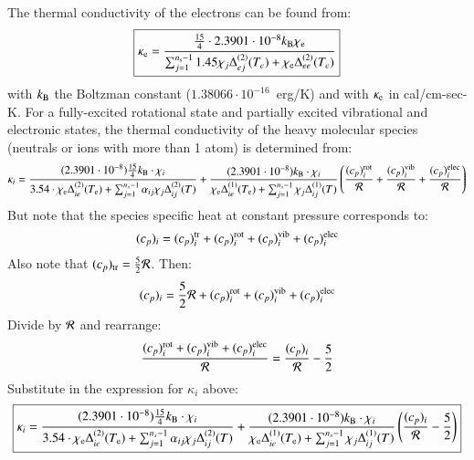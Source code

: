 \documentclass{warpdoc}
\newcommand\frameeqn[1]{\fbox{$\displaystyle #1$}}
\begin{document}
The thermal conductivity of the electrons can be found from:
%
\begin{equation}
\frameeqn{
\kappa_{\rm e}=\frac{\frac{15}{4} \cdot 2.3901 \cdot 10^{-8} k_{\rm B} \chi_{\rm e}}{\sum_{j=1}^{n_{\rm s}-1}1.45 \chi_j \Delta_{ej}^{(2)}(T_e) +\chi_{\rm e} \Delta_{ee}^{(2)}(T_e)  }
}
\end{equation}
%
with $k_{\rm B}$ the Boltzman constant ($1.38066\cdot10^{-16}$~erg/K) and with $\kappa_{\rm e}$ in cal/cm-sec-K.
For a fully-excited  rotational state and partially excited vibrational and electronic states, the thermal conductivity of the heavy molecular species (neutrals or ions with more than 1 atom) is determined from:
%
\begin{equation}
\kappa_i = 
\frac{(2.3901\cdot10^{-8}) \frac{15}{4} k_{\rm B}  \cdot \chi_i}{3.54\cdot \chi_{\rm e} \Delta_{ie}^{(2)}(T_{\rm e})+ \sum_{j=1}^{n_s-1} \alpha_{ij} \chi_j \Delta_{ij}^{(2)}(T) }
+
\frac{(2.3901\cdot10^{-8}) k_{\rm B}  \cdot \chi_i}{ \chi_{\rm e} \Delta_{ie}^{(1)}(T_{\rm e})+\sum_{j=1}^{n_s-1} \chi_j \Delta_{ij}^{(1)}(T) }
\left(
\frac{(c_p)_{i}^{{\rm rot}}}{\cal R}+ \frac{(c_p)_{i}^{{\rm vib}}}{\cal R}
+ \frac{(c_p)_{i}^{{\rm elec}}}{\cal R}
\right)
\end{equation}
%
But note that the species specific heat at constant pressure corresponds to:
%
\begin{equation}
    (c_p)_i=(c_p)_i^{{\rm tr}}+(c_p)_i^{{\rm rot}}+(c_p)_i^{{\rm vib}}+(c_p)_{i}^{{\rm elec}}
\end{equation}
%
Also note that $(c_p)_{\rm tr}=\frac{5}{2}{\cal R}$. Then:
%
\begin{equation}
    (c_p)_i=\frac{5}{2}{\cal R}+(c_p)_i^{\rm rot}+(c_p)_i^{\rm vib}+(c_p)_i^{\rm elec}
\end{equation}
%
Divide by $\cal R$ and rearrange:
%
\begin{equation}
    \frac{(c_p)_i^{\rm rot}+(c_p)_i^{\rm vib}+(c_p)_i^{\rm elec}}{\cal R}=\frac{(c_p)_i}{\cal R}-\frac{5}{2}
\end{equation}
%
Substitute in the expression for $\kappa_i$ above:
%
\begin{equation}
\frameeqn{
\kappa_i = 
\frac{(2.3901\cdot10^{-8}) \frac{15}{4} k_{\rm B}  \cdot \chi_i}{3.54\cdot \chi_{\rm e} \Delta_{ie}^{(2)}(T_{\rm e})+ \sum_{j=1}^{n_s-1} \alpha_{ij} \chi_j \Delta_{ij}^{(2)}(T) }
+
\frac{(2.3901\cdot10^{-8}) k_{\rm B}  \cdot \chi_i}{ \chi_{\rm e} \Delta_{ie}^{(1)}(T_{\rm e})+\sum_{j=1}^{n_s-1} \chi_j \Delta_{ij}^{(1)}(T) }
\left(
\frac{(c_p)_i}{\cal R}-\frac{5}{2}
\right)
}
\end{equation}
%
\end{document}
